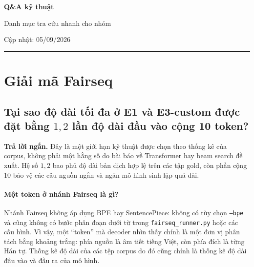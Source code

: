 \documentclass[11pt]{article}
\newcommand{\quickanswer}[1]{%
  \par\medskip
  \noindent\colorbox{qasoft}{%
    \parbox{\dimexpr\linewidth-2\fboxsep\relax}{%
      \textcolor{qaaccent}{\textbf{Trả lời ngắn.}} #1}}
  \par\medskip
}
\begin{document}
\begin{center}
  {\LARGE\bfseries Q\&A kỹ thuật\par}
  \vspace{3pt}
  {\large Danh mục tra cứu nhanh cho nhóm\par}
  \vspace{5pt}
  {\small\textcolor{qamuted}{Cập nhật: 05/09/2026}\par}
  \vspace{6pt}
  \color{qaaccent}\rule{0.72\linewidth}{1.2pt}
\end{center}

\tableofcontents

\section{Giải mã Fairseq}

\subsection{Tại sao độ dài tối đa ở E1 và E3-custom được đặt bằng
\texorpdfstring{$1{,}2$}{1,2} lần độ dài đầu vào cộng 10 token?}

\quickanswer{Đây là một giới hạn kỹ thuật được chọn theo thống kê của corpus,
không phải một hằng số do bài báo về Transformer hay beam search đề xuất. Hệ số
$1{,}2$ bao phủ độ dài bản dịch hợp lệ trên các tập gold, còn phần cộng 10 bảo
vệ các câu nguồn ngắn và ngăn mô hình sinh lặp quá dài.}

\paragraph{Một token ở nhánh Fairseq là gì?}
Nhánh Fairseq không áp dụng BPE hay SentencePiece: không có tùy chọn
\texttt{--bpe} và cũng không có bước phân đoạn dưới từ trong
\texttt{fairseq\_runner.py} hoặc các cấu hình. Vì vậy, một ``token'' mà
decoder nhìn thấy chính là một đơn vị phân tách bằng khoảng trắng: phía nguồn
là âm tiết tiếng Việt, còn phía đích là từng Hán tự. Thống kê độ dài của các
tệp corpus do đó cũng chính là thống kê độ dài đầu vào và đầu ra của mô hình.
\end{document}
